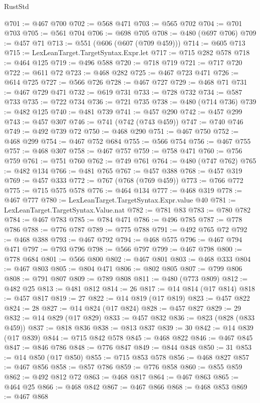\begin{lexlean}{RustStd}
\begin{coremodule}
{\begin{coremodule}
{{{{{{{{{{{{{{{{{{{{{{{{{{{{{{{{{@701 := @467 @700
@702 := @568 @471
@703 := @565 @702
@704 := @701 @703
@705 := @561 @704
@706 := @698 @705
@708 := @480 (@697 @706)
@709 := @457 @71
@713 := @551 (@606 (@607 (@709 @459)))
@714 := @605 @713
@715 := LexLeanTarget.TargetSyntax.Expr.let
@717 := @715 @282 @578
@718 := @464 @125
@719 := @496 @588
@720 := @718 @719
@721 := @717 @720
@722 := @611 @72
@723 := @468 @282
@725 := @467 @723 @471
@726 := @614 @725
@727 := @566 @726
@728 := @467 @727
@729 := @468 @71
@731 := @467 @729 @471
@732 := @619 @731
@733 := @728 @732
@734 := @587 @733
@735 := @722 @734
@736 := @721 @735
@738 := @480 (@714 @736)
@739 := @482 @125
@740 := @481 @739
@741 := @457 @290
@742 := @457 @299
@743 := @457 @307
@746 := @741 (@742 (@743 @459))
@747 := @740 @746
@749 := @492 @739 @72
@750 := @468 @290
@751 := @467 @750
@752 := @468 @299
@754 := @467 @752 @684
@755 := @566 @754
@756 := @467 @755
@757 := @468 @307
@758 := @467 @757
@759 := @758 @471
@760 := @756 @759
@761 := @751 @760
@762 := @749 @761
@764 := @480 (@747 @762)
@765 := @482 @134
@766 := @481 @765
@767 := @457 @388
@768 := @457 @319
@769 := @457 @333
@772 := @767 (@768 (@769 @459))
@773 := @766 @772
@775 := @715 @575 @578
@776 := @464 @134
@777 := @468 @319
@778 := @467 @777
@780 := LexLeanTarget.TargetSyntax.Expr.value @40
@781 := LexLeanTarget.TargetSyntax.Value.nat
@782 := @781 @83
@783 := @780 @782
@784 := @467 @783
@785 := @784 @471
@786 := @496 @785
@787 := @778 @786
@788 := @776 @787
@789 := @775 @788
@791 := @492 @765 @72
@792 := @468 @388
@793 := @467 @792
@794 := @468 @575
@796 := @467 @794 @471
@797 := @793 @796
@798 := @566 @797
@799 := @467 @798
@800 := @778 @684
@801 := @566 @800
@802 := @467 @801
@803 := @468 @333
@804 := @467 @803
@805 := @804 @471
@806 := @802 @805
@807 := @799 @806
@808 := @791 @807
@809 := @789 @808
@811 := @480 (@773 @809)
@812 := @482 @25
@813 := @481 @812
@814 := 26
@817 := @14 @814 (@17 @814)
@818 := @457 @817
@819 := 27
@822 := @14 @819 (@17 @819)
@823 := @457 @822
@824 := 28
@827 := @14 @824 (@17 @824)
@828 := @457 @827
@829 := 29
@832 := @14 @829 (@17 @829)
@833 := @457 @832
@836 := @823 (@828 (@833 @459))
@837 := @818 @836
@838 := @813 @837
@839 := 30
@842 := @14 @839 (@17 @839)
@844 := @715 @842 @578
@845 := @468 @822
@846 := @467 @845
@847 := @846 @786
@848 := @776 @847
@849 := @844 @848
@850 := 31
@853 := @14 @850 (@17 @850)
@855 := @715 @853 @578
@856 := @468 @827
@857 := @467 @856
@858 := @857 @786
@859 := @776 @858
@860 := @855 @859
@862 := @492 @812 @72
@863 := @468 @817
@864 := @467 @863
@865 := @464 @25
@866 := @468 @842
@867 := @467 @866
@868 := @468 @853
@869 := @467 @868
}}}}}}}}}}}}}}}}}}}}}}}}}}}}}}}}}
\end{coremodule}}
\end{coremodule}
\end{lexlean}
